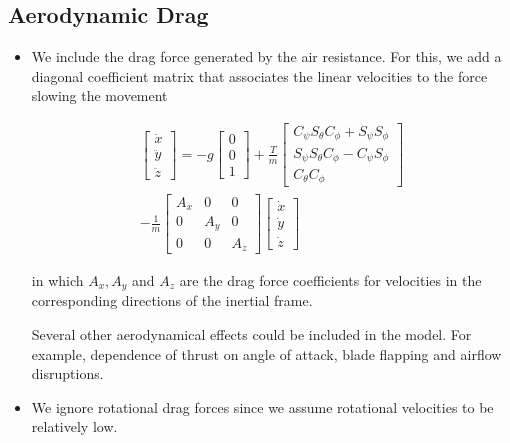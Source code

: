 \subsection{Aerodynamic Drag}

\begin{itemize}

  \item We include the drag force generated by the air resistance. For this, we add a diagonal coefficient matrix that associates the linear velocities to the force slowing the movement

  $$
    \begin{array}{l}
      \left[ \begin{array}{l}{\ddot{x}} \\ {\ddot{y}} \\ {\ddot{z}}\end{array}\right]=-g \left[ \begin{array}{l}{0} \\ {0} \\ {1}\end{array}\right]+\frac{T}{m} \left[ \begin{array}{c}{C_{\psi} S_{\theta} C_{\phi}+S_{\psi} S_{\phi}} \\ {S_{\psi} S_{\theta} C_{\phi}-C_{\psi} S_{\phi}} \\ {C_{\theta} C_{\phi}}\end{array}\right] \\
      - \frac{1}{m} \left[ \begin{array}{ccc}{A_{x}} & {0} & {0} \\ {0} & {A_{y}} & {0} \\ {0} & {0} & {A_{z}}\end{array}\right] \left[ \begin{array}{c}{\dot{x}} \\ {\dot{y}} \\ {\dot{z}}\end{array}\right]
    \end{array}
  $$

  in which $A_{x}, A_{y}$ and $A_{z}$ are the drag force coefficients for velocities in the corresponding directions of the inertial frame.

  Several other aerodynamical effects could be included in the model. For example,
dependence of thrust on angle of attack, blade flapping and airflow disruptions.

  \item We ignore rotational drag forces since we assume rotational velocities to be relatively low.

\end{itemize}

